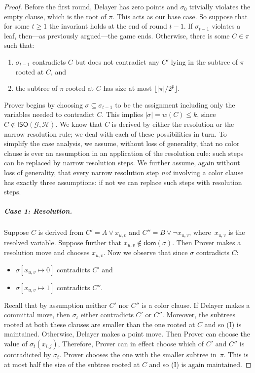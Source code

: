 \documentclass[10pt,a4paper]{article}
\newcommand{\graphG}{\mathcal{G}}
\newcommand{\graphH}{\mathcal{H}}
\newcommand{\dom}{\mathsf{dom}}
\newcommand{\ISO}{\mathsf{ISO}(\graphG, \graphH)}
\begin{document}
\begin{proof}
Before the first round, Delayer has zero points and $\sigma_0$ trivially violates the empty clause, which is the root of $\pi$. This acts as our base case.
So suppose that for some $t \ge 1$ the invariant holds at the end of round $t-1$. If $\sigma_{t-1}$ violates a leaf, then---as previously argued---the game ends. Otherwise, there is some $C \in \pi$ such that:
\begin{enumerate}
\item $\sigma_{t-1}$ contradicts $C$ but does not contradict any $C'$ lying in the subtree of $\pi$ rooted at $C$, and
\item the subtree of $\pi$ rooted at $C$ has size at most $\lfloor |\pi| / 2^p \rfloor$.
\end{enumerate} 
Prover begins by choosing $\sigma \subseteq \sigma_{t-1}$ to be the assignment including only the variables needed to contradict $C$. This implies $|\sigma| = w(C) \le k$, since $C \not \in \ISO$. We know that $C$ is derived by either the resolution or the narrow resolution rule; we deal with each of these possibilities in turn.
To simplify the case analysis, we assume, without loss of generality,
that no color clause is ever an assumption in an application of the
resolution rule: such steps can be replaced by narrow resolution
steps. We further assume, again without loss of generality, that every
narrow resolution step \emph{not} involving a color clause has exactly
three assumptions: if not we can replace such steps with resolution
steps.


\subparagraph{Case 1: Resolution.} Suppose $C$ is derived from $C'= A \vee x_{u,v}$ and $C''= B \vee \neg x_{u,v}$, where~$x_{u,v}$ is the resolved variable. Suppose further that $x_{u,v} \not \in \dom(\sigma)$.
Then Prover makes a resolution move and chooses $x_{u,v}$. Now we observe that since $\sigma$ contradicts $C$:
\begin{itemize}
\item $\sigma[x_{u,v} \mapsto 0]$ contradicts $C'$ and
\item $\sigma[x_{u,v} \mapsto 1]$ contradicts $C''$.
\end{itemize}
%
Recall that by assumption neither $C'$ nor $C''$ is a color clause. If Delayer makes a committal move, then $\sigma_t$ either contradicts $C'$ or $C''$. Moreover, the subtrees rooted at both these clauses are smaller than the one rooted at $C$ and so (I) is maintained. Otherwise, Delayer makes a point move. Then Prover can choose the value of $\sigma_t(x_{i,j})$, Therefore, Prover can in effect choose which of $C'$ and $C''$ is contradicted by $\sigma_t$. Prover chooses the one with the smaller subtree in~$\pi$. This is at most half the size of the subtree rooted at $C$ and so (I) is again maintained.


\end{proof}
\end{document}

